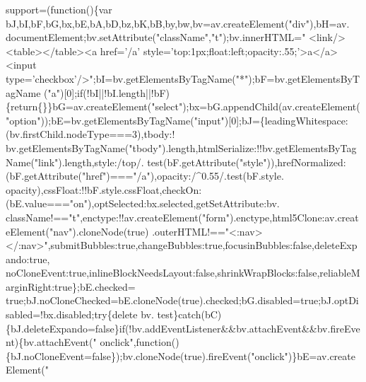 \begin{DoxyCode}
      support=(\textcolor{keyword}{function}()\{var bJ,bI,bF,bG,bx,bE,bA,bD,bz,bK,bB,by,bw,bv=av.createElement(\textcolor{stringliteral}{"div"}),bH=av.
      documentElement;bv.setAttribute(\textcolor{stringliteral}{"className"},\textcolor{stringliteral}{"t"});bv.innerHTML=\textcolor{stringliteral}{"   <link/><table></table><a href='/a'
       style='top:1px;float:left;opacity:.55;'>a</a><input type='checkbox'/>"};bI=bv.getElementsByTagName(\textcolor{stringliteral}{"*"});bF=bv.getElementsByTagName
      (\textcolor{stringliteral}{"a"})[0];\textcolor{keywordflow}{if}(!bI||!bI.length||!bF)\{\textcolor{keywordflow}{return}\{\}\}bG=av.createElement(\textcolor{stringliteral}{"select"});bx=bG.appendChild(av.createElement(\textcolor{stringliteral}{
      "option"}));bE=bv.getElementsByTagName(\textcolor{stringliteral}{"input"})[0];bJ=\{leadingWhitespace:(bv.firstChild.nodeType===3),tbody:!
      bv.getElementsByTagName(\textcolor{stringliteral}{"tbody"}).length,htmlSerialize:!!bv.getElementsByTagName(\textcolor{stringliteral}{"link"}).length,style:/top/.
      test(bF.getAttribute(\textcolor{stringliteral}{"style"})),hrefNormalized:(bF.getAttribute(\textcolor{stringliteral}{"href"})===\textcolor{stringliteral}{"/a"}),opacity:/^0.55/.test(bF.style.
      opacity),cssFloat:!!bF.style.cssFloat,checkOn:(bE.value===\textcolor{stringliteral}{"on"}),optSelected:bx.selected,getSetAttribute:bv.
      className!==\textcolor{stringliteral}{"t"},enctype:!!av.createElement(\textcolor{stringliteral}{"form"}).enctype,html5Clone:av.createElement(\textcolor{stringliteral}{"nav"}).cloneNode(\textcolor{keyword}{true})
      .outerHTML!==\textcolor{stringliteral}{"<:nav></:nav>"},submitBubbles:\textcolor{keyword}{true},changeBubbles:\textcolor{keyword}{true},focusinBubbles:\textcolor{keyword}{false},deleteExpando:\textcolor{keyword}{true},
      noCloneEvent:\textcolor{keyword}{true},inlineBlockNeedsLayout:\textcolor{keyword}{false},shrinkWrapBlocks:\textcolor{keyword}{false},reliableMarginRight:\textcolor{keyword}{true}\};bE.checked=\textcolor{keyword}{
      true};bJ.noCloneChecked=bE.cloneNode(\textcolor{keyword}{true}).checked;bG.disabled=\textcolor{keyword}{true};bJ.optDisabled=!bx.disabled;\textcolor{keywordflow}{try}\{\textcolor{keyword}{delete} bv.
      test\}\textcolor{keywordflow}{catch}(bC)\{bJ.deleteExpando=\textcolor{keyword}{false}\}\textcolor{keywordflow}{if}(!bv.addEventListener&&bv.attachEvent&&bv.fireEvent)\{bv.attachEvent(\textcolor{stringliteral}{"
      onclick"},\textcolor{keyword}{function}()\{bJ.noCloneEvent=\textcolor{keyword}{false}\});bv.cloneNode(\textcolor{keyword}{true}).fireEvent(\textcolor{stringliteral}{"onclick"})\}bE=av.createElement(\textcolor{stringliteral}{"
}
\end{DoxyCode}
